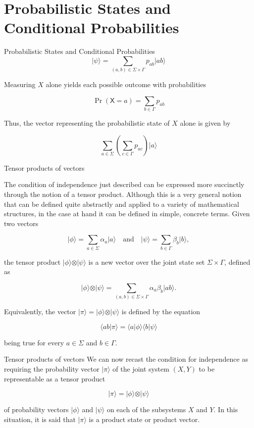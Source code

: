 \documentclass[12pt, aspectratio=169]{beamer}
\begin{document}
\section{Probabilistic States and Conditional Probabilities}
\begin{frame}{Probabilistic States and Conditional Probabilities}
    \[
    \vert \psi \rangle = \sum_{(a,b)\in\Sigma\times\Gamma} p_{ab} \vert ab\rangle
    \]

    Measuring \(X\) alone yields each possible outcome with probabilities

    \[
    \operatorname{Pr}(\mathsf{X} = a) = \sum_{b\in\Gamma} p_{ab}
    \]

    Thus, the vector representing the probabilistic state of \(X\) alone is given by

    \[
    \sum_{a\in\Sigma} \left(\sum_{c\in\Gamma} p_{ac}\right) \vert a\rangle
    \]
\end{frame}
\begin{frame}{Tensor products of vectors}


The condition of independence just described can be expressed more succinctly through the notion of a tensor product. Although this is a very general notion that can be defined quite abstractly and applied to a variety of mathematical structures, in the case at hand it can be defined in simple, concrete terms. Given two vectors

\[
\vert \phi \rangle = \sum_{a\in\Sigma} \alpha_a \vert a \rangle \quad \text{and} \quad \vert \psi \rangle = \sum_{b\in\Gamma} \beta_b \vert b \rangle,
\]

the tensor product \(\vert \phi \rangle \otimes \vert \psi \rangle\) is a new vector over the joint state set \(\Sigma \times \Gamma\), defined as

\[
\vert \phi \rangle \otimes \vert \psi \rangle = \sum_{(a,b)\in\Sigma\times\Gamma} \alpha_a \beta_b \vert ab\rangle.
\]

Equivalently, the vector \(\vert \pi \rangle = \vert \phi \rangle \otimes \vert \psi \rangle\) is defined by the equation

\[
\langle ab \vert \pi \rangle = \langle a \vert \phi \rangle \langle b \vert \psi \rangle
\]

being true for every \(a\in\Sigma\) and \(b\in\Gamma\).
\end{frame}
\begin{frame}{Tensor products of vectors}
We can now recast the condition for independence as requiring the probability vector \(\vert \pi \rangle\) of the joint system \((X,Y)\) to be representable as a tensor product

\[
\vert \pi \rangle = \vert \phi \rangle \otimes \vert \psi \rangle
\]

of probability vectors \(\vert \phi \rangle\) and \(\vert \psi \rangle\) on each of the subsystems \(X\) and \(Y\). In this situation, it is said that \(\vert \pi \rangle\) is a product state or product vector.



\end{frame}
\end{document}
